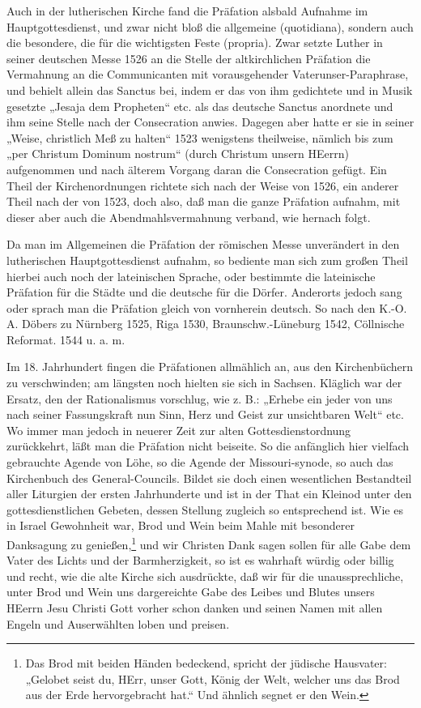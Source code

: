 Auch in der lutherischen Kirche fand die Präfation alsbald Aufnahme im Hauptgottesdienst, und zwar nicht bloß die allgemeine (quotidiana), sondern auch die besondere, die für die wichtigsten Feste (propria). Zwar setzte Luther in seiner deutschen Messe 1526 an die Stelle der altkirchlichen Präfation die Vermahnung an die Communicanten mit vorausgehender Vaterunser-Paraphrase, und behielt allein das Sanctus bei, indem er das von ihm gedichtete und in Musik gesetzte „Jesaja dem Propheten“ etc. als das deutsche Sanctus anordnete und ihm seine Stelle nach der Consecration anwies. Dagegen aber hatte er sie in seiner „Weise, christlich Meß zu halten“ 1523 wenigstens theilweise, nämlich bis zum „per Christum Dominum nostrum“ (durch Christum unsern HEerrn) aufgenommen und nach älterem Vorgang daran die Consecration gefügt. Ein Theil der Kirchenordnungen richtete sich nach der Weise von 1526, ein anderer Theil nach der von 1523, doch also, daß man die ganze Präfation aufnahm, mit dieser aber auch die Abendmahlsvermahnung verband, wie hernach folgt.

Da man im Allgemeinen die Präfation der römischen Messe unverändert in den lutherischen Hauptgottesdienst aufnahm, so bediente man sich zum großen Theil hierbei auch noch der lateinischen Sprache, oder bestimmte die lateinische
Präfation für die Städte und die deutsche für die Dörfer. Anderorts jedoch sang oder sprach man die Präfation gleich von vornherein deutsch. So nach den K.-O. A. Döbers zu Nürnberg 1525, Riga 1530, Braunschw.-Lüneburg 1542, Cöllnische Reformat. 1544 u. a. m.

Im 18. Jahrhundert fingen die Präfationen allmählich an, aus den Kirchenbüchern zu verschwinden; am längsten noch hielten sie sich in Sachsen. Kläglich war der Ersatz, den der Rationalismus vorschlug, wie z. B.: „Erhebe ein jeder von uns nach seiner Fassungskraft nun Sinn, Herz und Geist zur unsichtbaren Welt“ etc. Wo immer man jedoch in neuerer Zeit zur alten Gottesdienstordnung zurückkehrt, läßt man die Präfation nicht beiseite. So die anfänglich hier vielfach gebrauchte Agende von Löhe, so die Agende der Missouri-synode, so auch das Kirchenbuch des General-Councils. Bildet sie doch einen wesentlichen Bestandteil aller Liturgien der ersten Jahrhunderte und ist in der That ein Kleinod unter den gottesdienstlichen Gebeten, dessen Stellung zugleich so entsprechend ist. Wie es in Israel Gewohnheit war, Brod und Wein beim Mahle mit besonderer Danksagung zu genießen,\footnote{Das Brod mit beiden Händen bedeckend, spricht der jüdische Hausvater: „Gelobet seist du, HErr, unser Gott, König der Welt, welcher uns das Brod aus der Erde hervorgebracht hat.“ Und ähnlich segnet er den Wein.} und wir Christen Dank sagen sollen für alle Gabe dem Vater des Lichts und der Barmherzigkeit, so ist es wahrhaft würdig oder billig und recht, wie die alte Kirche sich ausdrückte, daß wir für die unaussprechliche, unter Brod und Wein uns dargereichte Gabe des Leibes und Blutes unsers HEerrn Jesu Christi Gott vorher schon danken und seinen Namen mit allen Engeln und Auserwählten loben und preisen.

